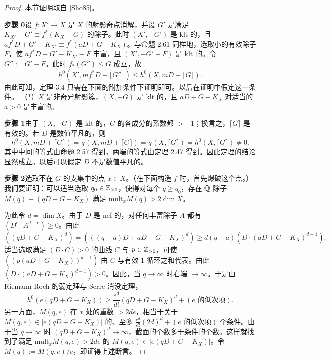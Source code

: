 \begin{proof}
本节证明取自 [Sho85]。

\par\medskip\noindent\textbf{步骤 0}\quad 设 $f:X'\to X$ 是 $X$ 的射影奇点消解，并设 $G'$ 是满足 $K_{X'}-G'\equiv f^*(K_X-G)$ 的除子。此时 $(X',-G')$ 是 klt 的，且 $af^*D+G'-K_{X'}\equiv f^*(aD+G-K_X)$。与命题 2.61 同样地，选取小的有效除子 $F$，使 $af^*D+G'-K_{X'}-F$ 丰富，且 $(X',-G'+F)$ 是 klt 的。令 $G'':=G'-F$。此时 $f_*(G'')\le G$ 成立，故
\[
h^0(X',mf^*D+\lceil G''\rceil)\le h^0(X,mD+\lceil G\rceil).
\]
由此可知，定理 3.4 只需在下面的附加条件下证明即可。以后在证明中假定这一条件。
（$*$）$X$ 是非奇异射影簇，$(X,-G)$ 是 klt 的，且 $aD+G-K_X$ 对适当的 $a>0$ 是丰富的。

\par\medskip\noindent\textbf{步骤 1}\quad 由于 $(X,-G)$ 是 klt 的，$G$ 的各成分的系数都 $>-1$；换言之，$\lceil G\rceil$ 是有效的。若 $D$ 是数值平凡的，则
\[
h^0(X,mD+\lceil G\rceil)=\chi(X,mD+\lceil G\rceil)=\chi(X,\lceil G\rceil)=h^0(X,\lceil G\rceil)\neq 0.
\]
其中中间的等式由命题 2.57 得到，两端的等式由定理 2.47 得到。因此定理的结论显然成立。以后可以假定 $D$ 不是数值平凡的。

\par\medskip\noindent\textbf{步骤 2}\quad 选取不在 $G$ 的支集中的点 $x\in X$。（在下面构造 $f$ 时，首先爆破这个点。）我们要证明：可以适当选取 $q_0\in\mathbb{Z}_{>0}$，使得对每个 $q\ge q_0$，存在 $\mathbb{Q}$-除子 $M(q)\equiv(qD+G-K_X)$ 满足 $\mathrm{mult}_xM(q)>2\dim X$。

为此令 $d=\dim X$。由于 $D$ 是 nef 的，对任何丰富除子 $A$ 都有 $(D^e\cdot A^{d-e})\ge 0$。由此
\[
((qD+G-K_X)^d)=(((q-a)D+aD+G-K_X)^d)\ge d(q-a)(D\cdot(aD+G-K_X)^{d-1}).
\]
适当选取满足 $(D\cdot C)>0$ 的曲线 $C$ 与 $p\in\mathbb{Z}_{>0}$，可使 $((p(aD+G-K_X))^{d-1})$ 由 $C$ 与有效 $1$-循环之和代表。由此 $(D\cdot(aD+G-K_X)^{d-1})>0$。因此，当 $q\to\infty$ 时右端 $\to\infty$。于是由 Riemann-Roch 的弱定理与 Serre 消没定理，
\[
h^0(e(qD+G-K_X))\ge\frac{e^d}{d!}(qD+G-K_X)^d+(\text{$e$ 的低次项}).
\]
另一方面，$M(q,e)$ 在 $x$ 处的重数 $>2de$，相当于关于 $M(q,e)\in|e(qD+G-K_X)|$ 的、至多 $\frac{e^d}{d!}(2d)^d+(\text{$e$ 的低次项})$ 个条件。由于当 $q\to\infty$ 时 $(qD+G-K_X)^d\to\infty$，截面的个数多于条件的个数。这样就找到了满足 $\mathrm{mult}_xM(q,e)>2de$ 的 $M(q,e)\in|e(qD+G-K_X)|$。令 $M(q):=M(q,e)/e$，即证得上述断言。


\end{proof}
